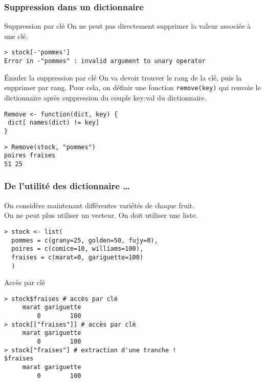 \documentclass[10pt]{beamer}
\begin{document}
\begin{frame}[fragile]
  \frametitle{Suppression dans un dictionnaire}
  \begin{block}{Suppression par clé}
    On ne peut pas directement supprimer la valeur associée à une clé.
    \begin{lstlisting}[style=block]
> stock[-'pommes']
Error in -"pommes" : invalid argument to unary operator    
\end{lstlisting}

  \end{block}

\begin{alertblock}{Émuler la suppression par clé}
  On va devoir trouver le rang de la clé, puis la supprimer par rang.
  Pour cela, on définir une fonction \texttt{remove(key)} qui renvoie le dictionnaire après suppression du couple key:val du dictionnaire.
  \begin{lstlisting}
Remove <- function(dict, key) {
 dict[ names(dict) != key]
}
\end{lstlisting}

\begin{lstlisting}
> Remove(stock, "pommes")
poires fraises
51 25  
\end{lstlisting}  
\end{alertblock}
\end{frame}


\begin{frame}[fragile]
  \frametitle{De l'utilité des dictionnaire \dots}
  On considère maintenant différentes variétés de chaque fruit.\\
  On ne peut plus utiliser un vecteur. On doit utiliser une liste.
  \begin{lstlisting}
> stock <- list(
  pommes = c(grany=25, golden=50, fujy=0),
  poires = c(comice=10, williams=100),
  fraises = c(marat=0, gariguette=100)
  )
\end{lstlisting}

\begin{block}{Accès par clé}
  \begin{lstlisting}[style=block]
> stock$fraises # accès par clé
     marat gariguette 
         0        100 
> stock[["fraises"]] # accès par clé
     marat gariguette 
         0        100 
> stock["fraises"] # extraction d'une tranche !
$fraises
     marat gariguette 
         0        100 
  \end{lstlisting}         
\end{block}
\end{frame}
\end{document}
